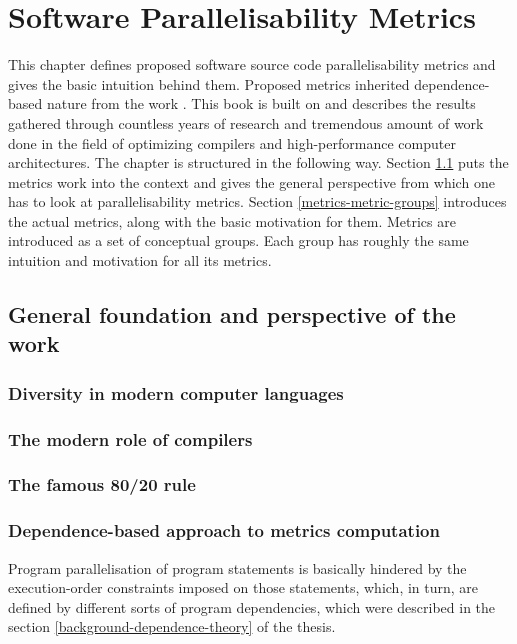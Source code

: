\chapter{Software Parallelisability Metrics}
\qquad This chapter defines proposed software source code parallelisability metrics and gives the basic intuition behind them. Proposed metrics inherited dependence-based nature from the work \cite{optimizing-compilers-book}. This book is built on and describes the results gathered through countless years of research and tremendous amount of work done in the field of optimizing compilers and high-performance computer architectures. \newline\null\qquad The chapter is structured in the following way. Section \ref{metrics-foundation-and-perspective} puts the metrics work into the context and gives the general perspective from which one has to look at parallelisability metrics. Section \ref{metrics-metric-groups} introduces the actual metrics, along with the basic motivation for them. Metrics are introduced as a set of conceptual groups. Each group has roughly the same intuition and motivation for all its metrics.  

\section{General foundation and perspective of the work} \label{metrics-foundation-and-perspective}

\subsection{Diversity in modern computer languages}

\subsection{The modern role of compilers}

\subsection{The famous 80/20 rule}


\subsection{Dependence-based approach to metrics computation}
\qquad Program parallelisation of program statements is basically hindered by the execution-order constraints imposed on those statements, which, in turn, are defined by different sorts of program dependencies, which were described in the section \ref{background-dependence-theory} of the thesis.   


